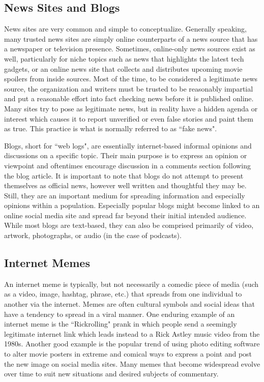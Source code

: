 \subsection{News Sites and Blogs}
News sites are very common and simple to conceptualize. Generally speaking, many trusted news sites are simply online counterparts of a news source that has a newspaper or television presence. Sometimes, online-only news sources exist as well, particularly for niche topics such as news that highlights the latest tech gadgets, or an online news site that collects and distributes upcoming movie spoilers from inside sources. Most of the time, to be considered a legitimate news source, the organization and writers must be trusted to be reasonably impartial and put a reasonable effort into fact checking news before it is published online. Many sites try to pose as legitimate news, but in reality have a hidden agenda or interest which causes it to report unverified or even false stories and paint them as true. This practice is what is normally referred to as ``fake news".

Blogs, short for ``web logs", are essentially internet-based informal opinions and discussions on a specific topic. Their main purpose is to express an opinion or viewpoint and oftentimes encourage discussion in a comments section following the blog article. It is important to note that blogs do not attempt to present themselves as official news, however well written and thoughtful they may be. Still, they are an important medium for spreading information and especially opinions within a population. Especially popular blogs might become linked to an online social media site and spread far beyond their initial intended audience. While most blogs are text-based, they can also be comprised primarily of video, artwork, photographs, or audio (in the case of podcasts). 

\subsection{Internet Memes}
An internet meme is typically, but not necessarily a comedic piece of media (such as a video, image, hashtag, phrase, etc.) that spreads from one individual to another via the internet. Memes are often cultural symbols and social ideas that have a tendency to spread in a viral manner. One enduring example of an internet meme is the ``Rickrolling" prank in which people send a seemingly legitimate internet link which leads instead to a Rick Astley music video from the 1980s. Another good example is the popular trend of using photo editing software to alter movie posters in extreme and comical ways to express a point and post the new image on social media sites. Many memes that become widespread evolve over time to suit new situations and desired subjects of commentary.

